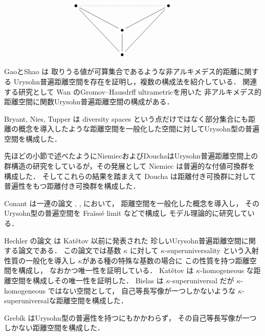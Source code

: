 \documentclass[leqno, 12pt]{jsarticle}
\begin{document}
  \[
   \xymatrix{
\bullet \ar@{.}[rrrr]\ar@{-}[rrdd] \ar@{-}[rrd] &  &  & & \bullet\ar@{-}[lldd]\ar@{-}[lld] \\
 &  & \bullet\ar@{-}[d]&  &  &\\
 &  & \bullet  &  & 
 }
\]




GaoとShao 
\cite{GS}
は
取りうる値が可算集合であるような非アルキメデス的距離に関する
Urysohn普遍距離空間を存在を証明し，複数の構成法を紹介している．
関連する研究として
Wan 
\cite{Wan}
のGromov--Hausdrff ultrametricを用いた
非アルキメデス的距離空間に関数Urysohn普遍距離空間の構成がある．



Bryant, Nies, Tupper 
\cite{BNT}
は diversity spaces という点だけではなく部分集合にも距離の概念を導入したような距離空間を一般化した空間に対してUrysohn型の普遍空間を構成した．



先ほどの小節で述べたようにNiemiecおよびDouchaはUrysohn普遍距離空間上の
群構造の研究をしているが，その発展として
Niemiec
 \cite{Nie2013}
は普遍的な付値可換群を構成した．
そしてこれらの結果を踏まえて
Doucha 
\cite{Doucha17}
は距離付き可換群に対して普遍性をもつ距離付き可換群を構成した．


Conant 
は一連の論文
\cite{conantthesis}, 
\cite{conant}, 
\cite{conant2}
において，
距離空間を一般化した概念を導入し，
そのUrysohn型の普遍空間を
Fra\"{i}ss\'e limit
などで構成し
モデル理論的に研究している．



Hechler
の論文 
\cite{Hechler}
は
Kat\v{e}tov 
\cite{Ka}
以前に発表された
珍しいUrysohn普遍距離空間に関する論文である．
この論文では基数
$\kappa$
に対して
$\kappa$-superuniversality
という入射性質の一般化を導入し
$\kappa$がある種の特殊な基数の場合に
この性質を持つ距離空間を構成し，
なおかつ唯一性を証明している．
Kat\v{e}tov 
\cite{Ka}は
$\kappa$-homogeneous
な距離空間を構成しその唯一性を証明した．
Bielas \cite{Bielas}
は
$\kappa$-superuniversal
だが
$\kappa$-homogeneous
ではない空間として，
自己等長写像が一つしかないような
$\kappa$-superuniversalな距離空間を構成した．


Greb\'{i}k \cite{Gre}
はUrysohn型の普遍性を持つにもかかわらず，
その自己等長写像が一つしかない距離空間を構成した．



\end{document}

